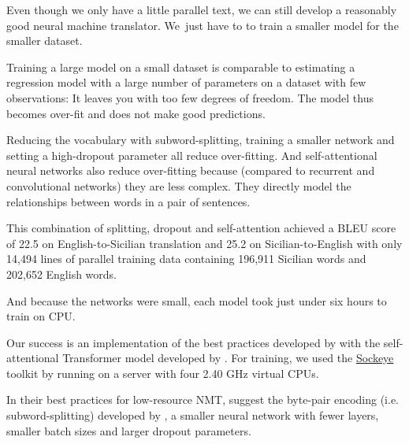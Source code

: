 \documentclass[10pt,letterpaper]{article}
\begin{document}
Even though we only have a little parallel text, we can still 
develop a reasonably good neural machine translator.
We~just have to to train a smaller model for the smaller dataset.
      
Training a large model on a small dataset is comparable to estimating a regression
model with a large number of parameters on a dataset with few observations: 
It leaves you with too few degrees of freedom.
The model thus becomes over-fit and does not make good predictions.
      
Reducing the vocabulary with subword-splitting,
training a smaller network and setting a high-dropout parameter all reduce over-fitting.
And self-attentional neural networks also reduce over-fitting because
(compared to recurrent and convolutional networks) they are less complex.  They
directly model the relationships between words in a pair of sentences.

This combination of splitting, dropout and self-attention achieved a BLEU score of
22.5 on English-to-Sicilian translation and 25.2 on Sicilian-to-English with only 14,494 lines
of parallel training data containing 196,911 Sicilian words and 202,652 English words.

And because the networks were small, each model took just under six hours to train on CPU.
      
Our success is an implementation of the best practices developed by \citet{sennrich2019loresnmt}
with the self-attentional Transformer model developed by \citet{vaswani2017attention}.
For training, we used the \href{https://awslabs.github.io/sockeye/}{Sockeye} toolkit by
\citet{hieber2017sockeye} running on a server with four 2.40 GHz virtual CPUs.
      
In their best practices for low-resource NMT, \citeauthor{sennrich2019loresnmt}
suggest the byte-pair encoding (i.e. subword-splitting) developed by 
\citep{sennrich2016subword}, a smaller neural network with fewer layers,
smaller batch sizes and larger dropout parameters.

      
\end{document}
